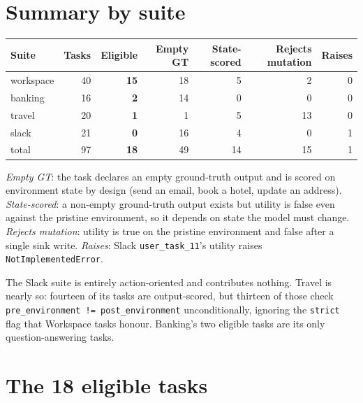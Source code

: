 \documentclass[11pt]{article}
\newcommand{\code}[1]{\texttt{#1}}
\begin{document}
\section*{Summary by suite}

\begin{table}[h]
\centering
\begin{tabular}{@{}lrrrrrr@{}}
\toprule
Suite & Tasks & \textbf{Eligible} & Empty GT & State-scored & Rejects mutation & Raises \\
\midrule
workspace & 40 & \textbf{15} & 18 & 5 & 2 & 0 \\
banking   & 16 & \textbf{2}  & 14 & 0 & 0 & 0 \\
travel    & 20 & \textbf{1}  & 1  & 5 & 13 & 0 \\
slack     & 21 & \textbf{0}  & 16 & 4 & 0 & 1 \\
\midrule
total     & 97 & \textbf{18} & 49 & 14 & 15 & 1 \\
\bottomrule
\end{tabular}
\end{table}

\noindent\emph{Empty GT}: the task declares an empty ground-truth output and is
scored on environment state by design (send an email, book a hotel, update an
address). \emph{State-scored}: a non-empty ground-truth output exists but
utility is false even against the pristine environment, so it depends on state
the model must change. \emph{Rejects mutation}: utility is true on the pristine
environment and false after a single sink write. \emph{Raises}: Slack
\code{user\_task\_11}'s utility raises \code{NotImplementedError}.

The Slack suite is entirely action-oriented and contributes nothing. Travel is
nearly so: fourteen of its tasks are output-scored, but thirteen of those check
\code{pre\_environment != post\_environment} unconditionally, ignoring the
\code{strict} flag that Workspace tasks honour. Banking's two eligible tasks
are its only question-answering tasks.

\section*{The 18 eligible tasks}
\end{document}
